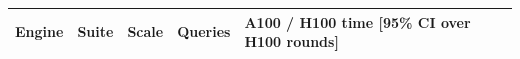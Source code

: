 \begin{tabular}{lllll}
\toprule
Engine & Suite & Scale & Queries & A100 / H100 time [95\% CI over H100 rounds] \\
\midrule
\bottomrule
\end{tabular}
